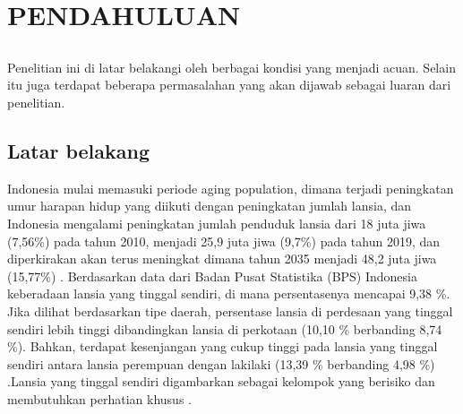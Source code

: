\chapter{PENDAHULUAN}
\vspace{1ex}

\section*{}
Penelitian ini di latar belakangi oleh berbagai kondisi yang menjadi acuan. Selain itu juga terdapat beberapa permasalahan yang akan dijawab sebagai luaran dari penelitian.
\vspace{1ex}

\section{Latar belakang}
\vspace{1ex}

Indonesia mulai memasuki periode aging population, dimana terjadi peningkatan umur harapan hidup yang diikuti dengan peningkatan jumlah lansia, dan Indonesia mengalami peningkatan jumlah penduduk lansia dari 18 juta jiwa (7,56\%) pada tahun 2010, menjadi 25,9 juta jiwa (9,7\%) pada tahun 2019, dan diperkirakan akan terus meningkat dimana tahun 2035 menjadi 48,2 juta jiwa (15,77\%) \cite{cit:1}. Berdasarkan data dari Badan Pusat Statistika (BPS) Indonesia keberadaan lansia yang tinggal sendiri, di mana persentasenya mencapai 9,38 \%. Jika dilihat berdasarkan tipe daerah, persentase lansia di perdesaan yang tinggal sendiri lebih tinggi dibandingkan lansia di perkotaan (10,10 \% berbanding 8,74 \%). Bahkan, terdapat kesenjangan yang cukup tinggi pada lansia yang tinggal sendiri antara lansia perempuan dengan lakilaki (13,39 \% berbanding 4,98 \%) \cite{cit:2}.Lansia yang tinggal sendiri digambarkan sebagai kelompok yang berisiko dan membutuhkan perhatian khusus \cite{cit:4}. 
\vspace{1ex}


